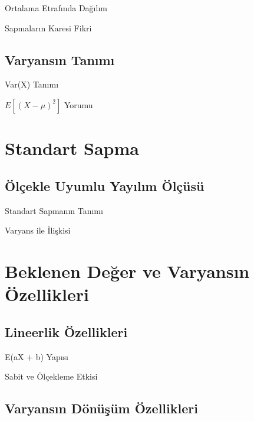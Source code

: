 \documentclass[light]{lutbeamer}
\begin{document}
\begin{frame}{Ortalama Etrafında Dağılım}
\end{frame}

\begin{frame}{Sapmaların Karesi Fikri}
\end{frame}

\subsection{Varyansın Tanımı}

\begin{frame}{Var(X) Tanımı}
\end{frame}

\begin{frame}{$E[(X-\mu)^2]$ Yorumu}
\end{frame}

\section{Standart Sapma}
\subsection{Ölçekle Uyumlu Yayılım Ölçüsü}

\begin{frame}{Standart Sapmanın Tanımı}
\end{frame}

\begin{frame}{Varyans ile İlişkisi}
\end{frame}

\section{Beklenen Değer ve Varyansın Özellikleri}
\subsection{Lineerlik Özellikleri}

\begin{frame}{E(aX + b) Yapısı}
\end{frame}

\begin{frame}{Sabit ve Ölçekleme Etkisi}
\end{frame}

\subsection{Varyansın Dönüşüm Özellikleri}
\end{document}
